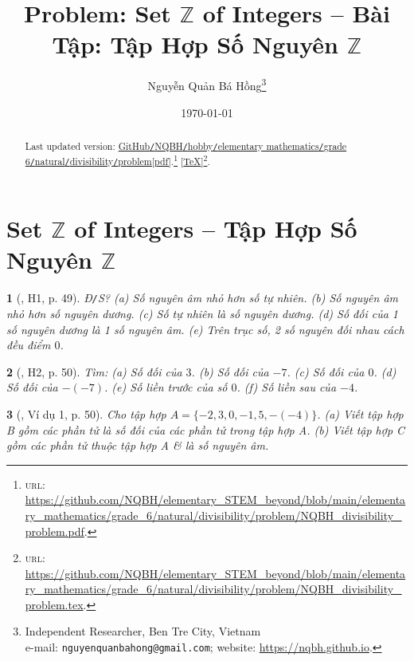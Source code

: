 \documentclass{article}
\title{Problem: Set $\mathbb{Z}$ of Integers -- Bài Tập: Tập Hợp Số Nguyên $\mathbb{Z}$}
\author{Nguyễn Quản Bá Hồng\footnote{Independent Researcher, Ben Tre City, Vietnam\\e-mail: \texttt{nguyenquanbahong@gmail.com}; website: \url{https://nqbh.github.io}.}}
\date{\today}
\newtheorem{baitoan}{}
\begin{document}
\maketitle
\begin{abstract}
	Last updated version: \href{https://github.com/NQBH/elementary_STEM_beyond/blob/main/elementary_mathematics/grade_6/natural/divisibility/problem/NQBH_divisibility_problem.pdf}{GitHub{\tt/}NQBH{\tt/}hobby{\tt/}elementary mathematics{\tt/}grade 6{\tt/}natural{\tt/}divisibility{\tt/}problem[pdf]}.\footnote{\textsc{url}: \url{https://github.com/NQBH/elementary_STEM_beyond/blob/main/elementary_mathematics/grade_6/natural/divisibility/problem/NQBH_divisibility_problem.pdf}.} [\href{https://github.com/NQBH/elementary_STEM_beyond/blob/main/elementary_mathematics/grade_6/natural/divisibility/problem/NQBH_divisibility_problem.tex}{\TeX}]\footnote{\textsc{url}: \url{https://github.com/NQBH/elementary_STEM_beyond/blob/main/elementary_mathematics/grade_6/natural/divisibility/problem/NQBH_divisibility_problem.tex}.}. 
\end{abstract}
\tableofcontents


\section{Set $\mathbb{Z}$ of Integers -- Tập Hợp Số Nguyên $\mathbb{Z}$}

\begin{baitoan}[\cite{Binh_boi_duong_Toan_6_tap_1}, H1, p. 49]
	{\rm Đ{\tt/}S?} (a) Số nguyên âm nhỏ hơn số tự nhiên. (b) Số nguyên âm nhỏ hơn số nguyên dương. (c) Số tự nhiên là số nguyên dương. (d) Số đối của 1 số nguyên dương là 1 số nguyên âm. (e) Trên trục số, 2 số nguyên đối nhau cách đều điểm $0$.
\end{baitoan}

\begin{baitoan}[\cite{Binh_boi_duong_Toan_6_tap_1}, H2, p. 50]
	Tìm: (a) Số đối của $3$. (b) Số đối của $-7$. (c) Số đối của $0$. (d) Số đối của $-(-7)$. (e) Số liền trước của số $0$. (f) Số liền sau của $-4$.
\end{baitoan}

\begin{baitoan}[\cite{Binh_boi_duong_Toan_6_tap_1}, Ví dụ 1, p. 50]
	Cho tập hợp $A = \{-2,3,0,-1,5,-(-4)\}$. (a) Viết tập hợp B gồm các phần tử là số đối của các phần tử trong tập hợp A. (b) Viết tập hợp C gồm các phần tử thuộc tập hợp A \& là số nguyên âm.
\end{baitoan}
\end{document}
